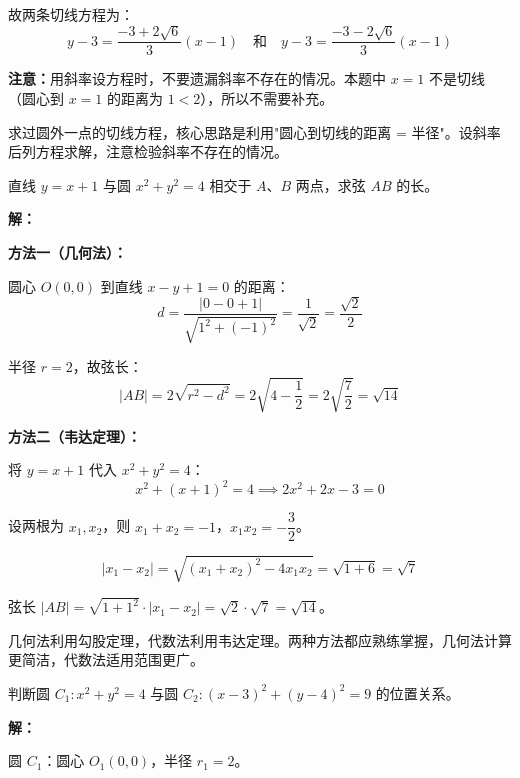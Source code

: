 \documentclass[12pt, a4paper]{ctexart}
\begin{document}
故两条切线方程为：
\[
y - 3 = \frac{-3 + 2\sqrt{6}}{3}(x - 1) \quad \text{和} \quad y - 3 = \frac{-3 - 2\sqrt{6}}{3}(x - 1)
\]

\textbf{注意：}用斜率设方程时，不要遗漏斜率不存在的情况。本题中 $x = 1$ 不是切线（圆心到 $x = 1$ 的距离为 $1 < 2$），所以不需要补充。

\begin{tipbox}[方法总结]
求过圆外一点的切线方程，核心思路是利用"圆心到切线的距离 = 半径"。设斜率后列方程求解，注意检验斜率不存在的情况。
\end{tipbox}

\bigskip

\begin{examplebox}[【例题7】弦长计算]
直线 $y = x + 1$ 与圆 $x^2 + y^2 = 4$ 相交于 $A$、$B$ 两点，求弦 $AB$ 的长。
\end{examplebox}

\textbf{解：}

\textbf{方法一（几何法）：}

圆心 $O(0, 0)$ 到直线 $x - y + 1 = 0$ 的距离：
\[
d = \frac{|0 - 0 + 1|}{\sqrt{1^2 + (-1)^2}} = \frac{1}{\sqrt{2}} = \frac{\sqrt{2}}{2}
\]

半径 $r = 2$，故弦长：
\[
|AB| = 2\sqrt{r^2 - d^2} = 2\sqrt{4 - \frac{1}{2}} = 2\sqrt{\frac{7}{2}} = \sqrt{14}
\]

\textbf{方法二（韦达定理）：}

将 $y = x + 1$ 代入 $x^2 + y^2 = 4$：
\[
x^2 + (x + 1)^2 = 4 \implies 2x^2 + 2x - 3 = 0
\]

设两根为 $x_1, x_2$，则 $x_1 + x_2 = -1$，$x_1 x_2 = -\dfrac{3}{2}$。

\[
|x_1 - x_2| = \sqrt{(x_1 + x_2)^2 - 4x_1 x_2} = \sqrt{1 + 6} = \sqrt{7}
\]

弦长 $|AB| = \sqrt{1 + 1^2} \cdot |x_1 - x_2| = \sqrt{2} \cdot \sqrt{7} = \boxed{\sqrt{14}}$。

\begin{tipbox}[方法总结]
几何法利用勾股定理，代数法利用韦达定理。两种方法都应熟练掌握，几何法计算更简洁，代数法适用范围更广。
\end{tipbox}

\bigskip

\begin{examplebox}[【例题8】圆与圆的位置关系]
判断圆 $C_1: x^2 + y^2 = 4$ 与圆 $C_2: (x - 3)^2 + (y - 4)^2 = 9$ 的位置关系。
\end{examplebox}

\textbf{解：}

圆 $C_1$：圆心 $O_1(0, 0)$，半径 $r_1 = 2$。
\end{document}

